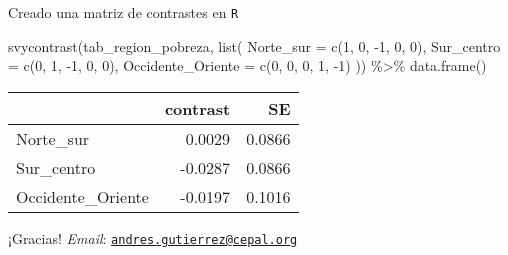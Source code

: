 \documentclass[
  ignorenonframetext,
]{beamer}
\newenvironment{Shaded}{\begin{snugshade}}{\end{snugshade}}
\newcommand{\AttributeTok}[1]{\textcolor[rgb]{0.77,0.63,0.00}{#1}}
\newcommand{\DecValTok}[1]{\textcolor[rgb]{0.00,0.00,0.81}{#1}}
\newcommand{\FunctionTok}[1]{\textcolor[rgb]{0.00,0.00,0.00}{#1}}
\newcommand{\NormalTok}[1]{#1}
\newcommand{\SpecialCharTok}[1]{\textcolor[rgb]{0.00,0.00,0.00}{#1}}
\begin{document}
\begin{frame}[fragile]{Creado una matriz de contrastes en \texttt{R}}
\protect\hypertarget{creado-una-matriz-de-contrastes-en-r-1}{}
\scriptsize

\begin{Shaded}
\begin{Highlighting}[]
\FunctionTok{svycontrast}\NormalTok{(tab\_region\_pobreza, }\FunctionTok{list}\NormalTok{(}
           \AttributeTok{Norte\_sur =} \FunctionTok{c}\NormalTok{(}\DecValTok{1}\NormalTok{, }\DecValTok{0}\NormalTok{, }\SpecialCharTok{{-}}\DecValTok{1}\NormalTok{, }\DecValTok{0}\NormalTok{, }\DecValTok{0}\NormalTok{),}
          \AttributeTok{Sur\_centro =} \FunctionTok{c}\NormalTok{(}\DecValTok{0}\NormalTok{, }\DecValTok{1}\NormalTok{, }\SpecialCharTok{{-}}\DecValTok{1}\NormalTok{, }\DecValTok{0}\NormalTok{, }\DecValTok{0}\NormalTok{),}
   \AttributeTok{Occidente\_Oriente =} \FunctionTok{c}\NormalTok{(}\DecValTok{0}\NormalTok{, }\DecValTok{0}\NormalTok{, }\DecValTok{0}\NormalTok{, }\DecValTok{1}\NormalTok{, }\SpecialCharTok{{-}}\DecValTok{1}\NormalTok{)}
\NormalTok{            )) }\SpecialCharTok{\%\textgreater{}\%} \FunctionTok{data.frame}\NormalTok{()}
\end{Highlighting}
\end{Shaded}

\begin{tabular}{l|r|r}
\hline
  & contrast & SE\\
\hline
Norte\_sur & 0.0029 & 0.0866\\
\hline
Sur\_centro & -0.0287 & 0.0866\\
\hline
Occidente\_Oriente & -0.0197 & 0.1016\\
\hline
\end{tabular}
\end{frame}

\begin{frame}{¡Gracias!}
\protect\hypertarget{gracias}{}
\emph{Email}:
\href{mailto:andres.gutierrez@cepal.org}{\nolinkurl{andres.gutierrez@cepal.org}}
\end{frame}
\end{document}

